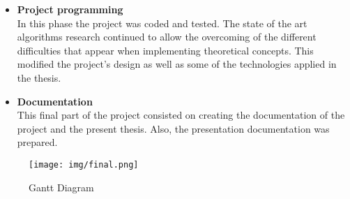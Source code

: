 \begin{itemize}
			 	\item{\textbf{Project programming}}\\
			 	In this phase the project was coded and tested. The state of the art algorithms research continued to allow the overcoming of the different difficulties that appear when implementing theoretical concepts. This modified the project's design as well as some of the technologies applied in the thesis. 

			 	\item{\textbf{Documentation}}\\
			 	This final part of the project consisted on creating the documentation of the project and the present thesis. 
			 	Also, the presentation documentation was prepared. 
			 	\\
		 \end{itemize}

		\begin{figure}[H]
			\centering
		    \texttt{[image: img/final.png]}
			\caption[Gantt Diagram]{Gantt Diagram}	
			\label{gantt_diagram}
		\end{figure}